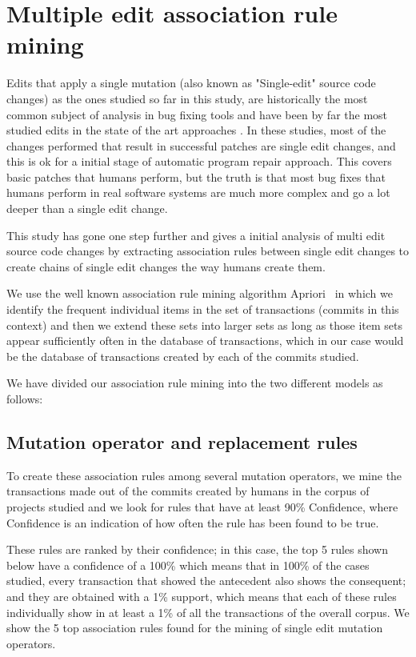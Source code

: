 \documentclass[conference]{IEEEtran}
\begin{document}
\section{Multiple edit association rule mining} \label{multEdit}

Edits that apply a single mutation (also known as "Single-edit" source code 
changes) as the ones studied so far in this study, are historically the most 
common subject of analysis in bug fixing tools and have been by far the most 
studied edits in the state of the art approaches 
\cite{Qi15,fan15,kim2013,Long2016,legoues12,Qi13,Qi14,xuan16}.
In these studies, most of the changes performed that result in 
successful patches are single edit changes, and this is ok for a initial stage 
of automatic program repair approach. This covers basic patches that humans 
perform, but the truth is that most bug fixes that humans perform in real 
software systems are much more complex and go a lot deeper than a single edit 
change. 

This study has gone one step further and gives a initial analysis of multi edit 
source code changes by extracting association rules between single edit changes 
to create chains of single edit changes the way humans create them.

We use the 
well known association rule mining algorithm
Apriori~\cite{Agrawal94,Liu98,Zaki2000} in which we identify the frequent 
individual items in the set of transactions (commits in this context) and then we extend these sets into 
larger sets as long as those item sets appear sufficiently often in the database 
of transactions, which in our case would be the database of transactions created 
by each of the commits studied.

We have divided our association rule mining into the two different models as 
follows:


\subsection{Mutation operator and replacement rules}

To create these association rules among several mutation operators, we mine the transactions made out of the commits created by humans in the corpus of projects studied and we look for rules that have at least 90\% Confidence, where Confidence is an indication of how often the rule has been found to be true. 

These rules are ranked by their confidence; in this case, the top 5 rules shown below have a confidence of a 100\% which means that in 100\% of the cases studied, every transaction that showed the antecedent also shows the consequent; and they are obtained with a 1\% support, which means that each of these rules individually show in at least a 1\% of all the transactions of the overall corpus. We show the 5  top association rules found for the mining of single edit mutation operators.
\end{document}
